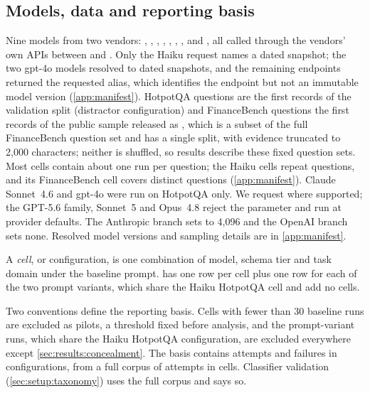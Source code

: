 

\subsection{Models, data and reporting basis}
\label{sec:setup:basis}

Nine models from two vendors: , ,
, , ,
, ,
 and , all called through the
vendors' own APIs between  and
. Only the Haiku request names a dated snapshot;
the two gpt-4o models resolved to dated snapshots, and the remaining
endpoints returned the requested alias, which identifies the endpoint but
not an immutable model version (\cref{app:manifest}). HotpotQA
\citep{yang2018hotpotqa} questions are the first records of the
validation split (distractor configuration) and FinanceBench
\citep{islam2023financebench} questions the first records of the public
sample released as , which is a subset of the
full FinanceBench question set and has a single  split, with
evidence truncated to 2{,}000 characters; neither is shuffled,
so results describe these fixed question sets. Most cells contain about
one run per question; the Haiku cells repeat questions, and its
FinanceBench cell covers
 distinct questions
(\cref{app:manifest}). Claude Sonnet~4.6 and gpt-4o were run on HotpotQA
only. We request  where supported; the GPT-5.6 family,
Sonnet~5 and Opus~4.8 reject the parameter and run at provider defaults.
The Anthropic branch sets  to 4{,}096 and the OpenAI
branch sets none. Resolved model versions and sampling details are in
\cref{app:manifest}.

A \emph{cell}, or configuration, is one combination of model, schema
tier and task domain under the baseline prompt.  has
one row per cell plus one row for each of the two prompt variants,
which share the Haiku HotpotQA cell and add no cells.

Two conventions define the reporting basis. Cells with fewer than 30
baseline runs are excluded as pilots, a threshold fixed before analysis,
and the  prompt-variant runs, which share the
Haiku HotpotQA configuration, are excluded everywhere except
\cref{sec:results:concealment}. The basis contains
 attempts and  failures in
 configurations, from a full corpus of
 attempts in  cells. Classifier
validation (\cref{sec:setup:taxonomy}) uses the full corpus and says so.

